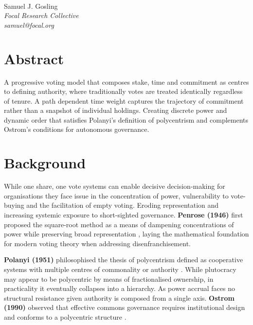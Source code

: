 \documentclass[a4paper,12pt]{article}
\begin{document}
\begin{center}
{\huge {}} \\[2em]
{\large {}\selectfont Samuel J. Gosling} \\[.25em]
{\large \itshape \tnr Focal Research Collective} \\[.25em]
{\large \itshape \tnr samuel@focal.org} \\[1.5em]

\end{center}

\section*{\signifier Abstract}

\vspace{1em}
\begin{mdframed}[
  linewidth=190000sp,
  linecolor=black,
  topline=false,
  bottomline=false,
  rightline=false,
  innerleftmargin=10pt,
  innerrightmargin=1pt,
  innertopmargin=0pt,
  innerbottommargin=-0.5pt
]
{\small{}\selectfont
{} 
\frenchspacing
A progressive voting model that composes stake, time and commitment as centres to defining authority, where traditionally votes are treated identically regardless of tenure. A path dependent time weight captures the trajectory of commitment rather than a snapshot of individual holdings. Creating discrete power and dynamic order that satisfies Polanyi's definition of polycentrism and complements Ostrom's conditions for autonomous governance.\par}
\end{mdframed}

\section{\signifier Background}
While one share, one vote systems can enable decisive decision-making for organisations they face issue in the concentration of power, vulnerability to vote-buying and the facilitation of empty voting. Eroding representation and increasing systemic exposure to short-sighted governance.  \textbf{Penrose (1946)} first proposed the square-root method as a means of dampening concentrations of power while preserving broad representation \cite{penrose1946}, laying the mathematical foundation for modern voting theory when addressing disenfranchisement.

\textbf{Polanyi (1951)} philosophised the thesis of polycentrism defined as cooperative systems with multiple centres of commonality or authority \cite{polanyi1951}. While plutocracy may appear to be polycentric by means of fractionalised ownership, in practicality it eventually collapses into a hierarchy. As power accrual faces no structural resistance given authority is composed from a single axis. \textbf{Ostrom (1990)} observed that effective commons governance requires institutional design and conforms to a polycentric structure \cite{ostrom1990}.
\end{document}
